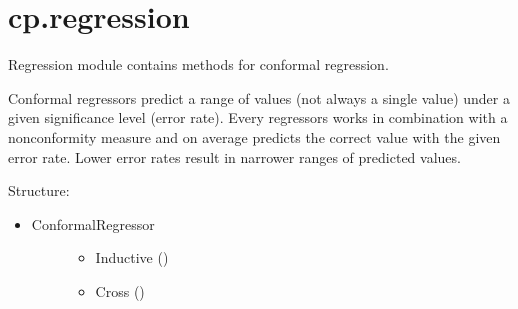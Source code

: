 \documentclass[letterpaper,10pt,english]{sphinxmanual}
\begin{document}
\begin{fulllineitems}

\begin{fulllineitems}
\label{cp.nonconformity:cp.nonconformity.AvgErrorKNN.avg_abs_inv}
\end{fulllineitems}


\begin{fulllineitems}
\label{cp.nonconformity:cp.nonconformity.AvgErrorKNN.nonconformity}
\end{fulllineitems}


\begin{fulllineitems}
\label{cp.nonconformity:cp.nonconformity.AvgErrorKNN.predict}
\end{fulllineitems}


\end{fulllineitems}



\section{cp.regression}
\label{cp.regression:cp-regression}\label{cp.regression::doc}\label{cp.regression:module-cp.regression}
Regression module contains methods for conformal regression.

Conformal regressors predict a range of values (not always a single value) under a given
significance level (error rate). Every regressors works in combination with a nonconformity measure
and on average predicts the correct value with the given error rate. Lower error rates result in
narrower ranges of predicted values.

Structure:
\begin{itemize}
\item {} \begin{description}
\item[{ConformalRegressor}] \leavevmode\begin{itemize}
\item {} 
Inductive ({\hyperref[cp.regression:cp.regression.InductiveRegressor]{}})

\item {} 
Cross ({\hyperref[cp.regression:cp.regression.CrossRegressor]{}})

\end{itemize}

\end{description}

\end{itemize}
\end{document}
